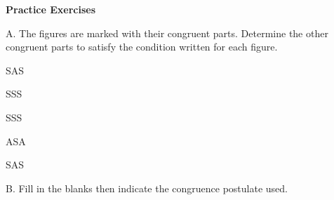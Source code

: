 \def\figdir{/storage/emulated/0/Documents/documents/latex/1920/Grade-8/3rd/triangle-congruence-postulates/f}

\textbf{Practice Exercises}

\vspce

A. The figures are marked with their congruent parts. Determine the other congruent parts to satisfy the condition written for each figure. 


\begin{enumerate}[label = \arabic*. ]

\begin{multicols}{2}

\item SAS \\

\vspace*{3ex} 
\item[2. ] SSS\\

\end{multicols} 
\end{enumerate} 

\vspace*{-6ex}

\begin{enumerate}[label = \arabic*. ]
\begin{multicols}{3}
\item[3. ] SSS\\


\item[4. ] ASA\\


\item[5. ] SAS\\


\end{multicols} 

\end{enumerate} 

B. Fill in the blanks then indicate the congruence postulate used. 

\begin{enumerate}[label = \arabic*. ]
\begin{multicols}{3}
\item 
\item 
\item 

\end{multicols} 
\end{enumerate}  
 

